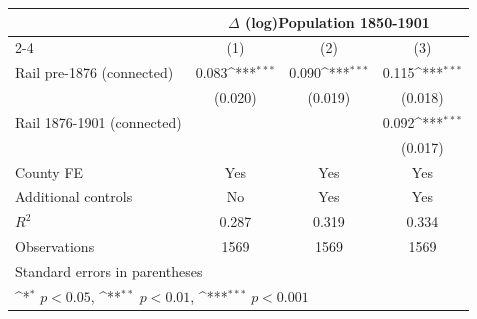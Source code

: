 {
\def\sym#1{\ifmmode^{#1}\else\(^{#1}\)\fi}
\begin{tabular}{l*{3}{c}}
\toprule
                &\multicolumn{3}{c}{$\Delta$ (log)Population 1850-1901}  \\\cmidrule(lr){2-4}
                &\multicolumn{1}{c}{(1)}         &\multicolumn{1}{c}{(2)}         &\multicolumn{1}{c}{(3)}         \\
\midrule
Rail pre-1876 (connected)&    0.083\sym{***}&    0.090\sym{***}&    0.115\sym{***}\\
                &  (0.020)         &  (0.019)         &  (0.018)         \\
Rail 1876-1901 (connected)&                  &                  &    0.092\sym{***}\\
                &                  &                  &  (0.017)         \\
County FE       &      Yes         &      Yes         &      Yes         \\
Additional controls &       No         &      Yes         &      Yes         \\
\midrule
\(R^{2}\)       &    0.287         &    0.319         &    0.334         \\
Observations    &     1569         &     1569         &     1569         \\
\bottomrule
\multicolumn{4}{l}{\footnotesize Standard errors in parentheses}\\
\multicolumn{4}{l}{\footnotesize \sym{*} \(p<0.05\), \sym{**} \(p<0.01\), \sym{***} \(p<0.001\)}\\
\end{tabular}
}
